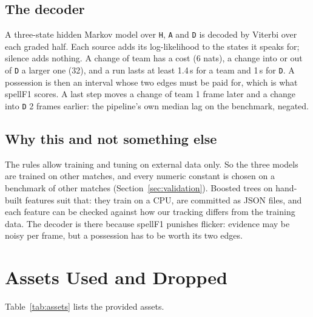 \documentclass[conference,a4paper]{IEEEtran}
\newcommand{\code}[1]{\texttt{#1}}
\begin{document}
\subsection{The decoder}
A three-state hidden Markov model over \code{H}, \code{A} and \code{D} is decoded by Viterbi over each graded half.
Each source adds its log-likelihood to the states it speaks for; silence adds nothing. A change of team has a cost
(6 nats), a change into or out of \code{D} a larger one (32), and a run lasts at least 1.4\,s for a team and 1\,s
for \code{D}. A possession is then an interval whose two edges must be paid for, which is what spellF1 scores. A
last step moves a change of team 1 frame later and a change into \code{D} 2 frames earlier: the pipeline's own
median lag on the benchmark, negated.

\subsection{Why this and not something else}
The rules allow training and tuning on external data only. So the three models are trained on other matches, and
every numeric constant is chosen on a benchmark of other matches (Section~\ref{sec:validation}). Boosted trees on
hand-built features suit that: they train on a CPU, are committed as JSON files, and each feature can be checked
against how our tracking differs from the training data. The decoder is there because spellF1 punishes flicker:
evidence may be noisy per frame, but a possession has to be worth its two edges.

\section{Assets Used and Dropped}

Table~\ref{tab:assets} lists the provided assets.
\end{document}
